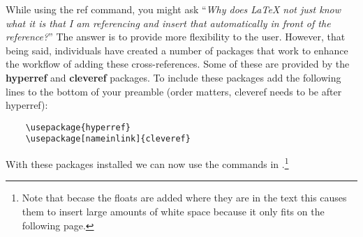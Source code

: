       While using the ref command, you might ask ``\textit{Why does \LaTeX{} not just know what it is that I am referencing and insert that automatically in front of the reference?}''
      The answer is to provide more flexibility to the user.
      However, that being said, individuals have created a number of packages that work to enhance the workflow of adding these cross-references.
      Some of these are provided by the \textbf{hyperref} and \textbf{cleveref} packages.
      To include these packages add the following lines to the bottom of your preamble (order matters, cleveref needs to be after hyperref):
      \begin{verbatim}
    \usepackage{hyperref}
    \usepackage[nameinlink]{cleveref}\end{verbatim}
      With these packages installed we can now use the commands in .\footnote{Note that becase the floats are added where they are in the text this causes them to insert large amounts of white space because it only fits on the following page.}
